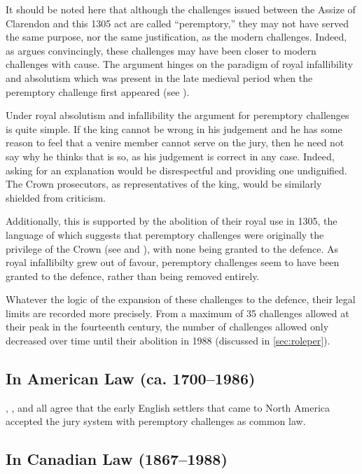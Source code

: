 It should be noted here that although the challenges issued between the Assize of Clarendon and this 1305 act are called
``peremptory,'' they may not have served the same purpose, nor the same justification, as the modern challenges. Indeed, as
\cite{hoffman1997} argues convincingly, these challenges may have been closer to modern challenges with cause. The argument hinges
on the paradigm of royal infallibility and absolutism which was present in the late medieval period when the peremptory challenge
first appeared (see \cite{burgess1992}).

Under royal absolutism and infallibility the argument for peremptory challenges is quite simple. If the king cannot be wrong in
his judgement and he has some reason to feel that a venire member cannot serve on the jury, then he need not say why he thinks
that is so, as his judgement is correct in any case. Indeed, asking for an explanation would be disrespectful and providing one
undignified. The Crown prosecutors, as representatives of the king, would be similarly shielded from criticism.

Additionally, this is supported by the abolition of their royal use in 1305, the language of which suggests that peremptory
challenges were originally the privilege of the Crown (see \cite{hoffman1997} and \cite{vandykejurysel}), with none being granted
to the defence. As royal infallibilty grew out of favour, peremptory challenges seem to have been granted to the defence, rather
than being removed entirely.

Whatever the logic of the expansion of these challenges to the defence, their legal limits are recorded more precisely. From a
maximum of 35 challenges allowed at their peak in the fourteenth century, the number of challenges allowed only decreased over
time until their abolition in 1988 (discussed in \ref{sec:roleper}).

\subsection{In American Law (ca. 1700--1986)}

\cite{vonmosch1921}, \cite{hoffman1997}, and \cite{vandykejurysel} all agree that the early English settlers that came to North
America accepted the jury system with peremptory challenges as common law.

\subsection{In Canadian Law (1867--1988)}